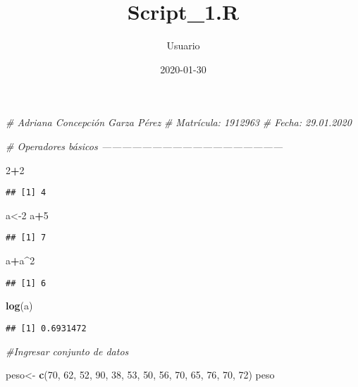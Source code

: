 \documentclass[
]{article}
\title{Script\_1.R}
\author{Usuario}
\date{2020-01-30}
\newenvironment{Shaded}{\begin{snugshade}}{\end{snugshade}}
\newcommand{\CommentTok}[1]{\textcolor[rgb]{0.56,0.35,0.01}{\textit{#1}}}
\newcommand{\DecValTok}[1]{\textcolor[rgb]{0.00,0.00,0.81}{#1}}
\newcommand{\KeywordTok}[1]{\textcolor[rgb]{0.13,0.29,0.53}{\textbf{#1}}}
\newcommand{\NormalTok}[1]{#1}
\newcommand{\OperatorTok}[1]{\textcolor[rgb]{0.81,0.36,0.00}{\textbf{#1}}}
\newcommand{\StringTok}[1]{\textcolor[rgb]{0.31,0.60,0.02}{#1}}
\begin{document}
\maketitle

\begin{Shaded}
\begin{Highlighting}[]
\CommentTok{# Adriana Concepción Garza Pérez}
\CommentTok{# Matrícula: 1912963}
\CommentTok{# Fecha: 29.01.2020}

\CommentTok{# Operadores básicos ------------------------------------------------------}

\DecValTok{2}\OperatorTok{+}\DecValTok{2}
\end{Highlighting}
\end{Shaded}

\begin{verbatim}
## [1] 4
\end{verbatim}

\begin{Shaded}
\begin{Highlighting}[]
\NormalTok{a<-}\DecValTok{2}
\NormalTok{a}\OperatorTok{+}\DecValTok{5}
\end{Highlighting}
\end{Shaded}

\begin{verbatim}
## [1] 7
\end{verbatim}

\begin{Shaded}
\begin{Highlighting}[]
\NormalTok{a}\OperatorTok{+}\NormalTok{a}\OperatorTok{^}\DecValTok{2}
\end{Highlighting}
\end{Shaded}

\begin{verbatim}
## [1] 6
\end{verbatim}

\begin{Shaded}
\begin{Highlighting}[]
\KeywordTok{log}\NormalTok{(a)}
\end{Highlighting}
\end{Shaded}

\begin{verbatim}
## [1] 0.6931472
\end{verbatim}

\begin{Shaded}
\begin{Highlighting}[]
\CommentTok{#Ingresar conjunto de datos }

\NormalTok{peso<-}\StringTok{ }\KeywordTok{c}\NormalTok{(}\DecValTok{70}\NormalTok{, }\DecValTok{62}\NormalTok{, }\DecValTok{52}\NormalTok{, }\DecValTok{90}\NormalTok{, }\DecValTok{38}\NormalTok{, }\DecValTok{53}\NormalTok{, }\DecValTok{50}\NormalTok{, }\DecValTok{56}\NormalTok{, }\DecValTok{70}\NormalTok{, }\DecValTok{65}\NormalTok{,}
         \DecValTok{76}\NormalTok{, }\DecValTok{70}\NormalTok{, }\DecValTok{72}\NormalTok{)}
\NormalTok{peso}
\end{Highlighting}
\end{Shaded}
\end{document}
